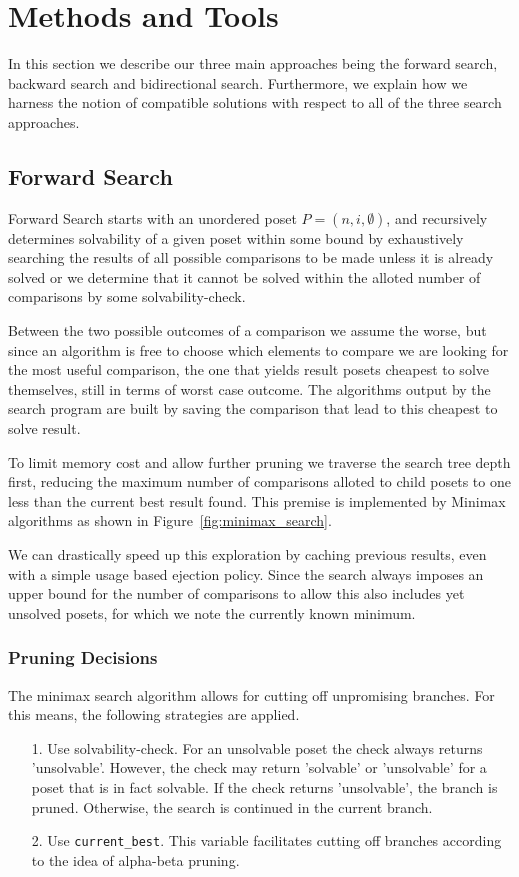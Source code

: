 \documentclass[10pt,journal,compsoc]{IEEEtran}
\begin{document}
\section{Methods and Tools}
In this section we describe our three main approaches being the forward search, backward search and bidirectional search.
Furthermore, we explain how we harness the notion of compatible solutions with respect to all of the three search approaches.

\subsection{Forward Search}\label{chapter:forward_search}
Forward Search starts with an unordered poset $P=(n,i,\emptyset)$, and recursively determines solvability of a given poset within some bound by exhaustively searching the results of all possible comparisons to be made unless it is already solved or we determine that it cannot be solved within the alloted number of comparisons by some solvability-check.

Between the two possible outcomes of a comparison we assume the worse, but since an algorithm is free to choose which elements to compare we are looking for the most useful comparison, the one that yields result posets cheapest to solve themselves, still in terms of worst case outcome.
The algorithms output by the search program are built by saving the comparison that lead to this cheapest to solve result.

To limit memory cost and allow further pruning we traverse the search tree depth first, reducing the maximum number of comparisons alloted to child posets to one less than the current best result found.
This premise is implemented by Minimax algorithms as shown in Figure~\ref{fig:minimax_search}.

We can drastically speed up this exploration by caching previous results, even with a simple usage based ejection policy. Since the search always imposes an upper bound for the number of comparisons to allow this also includes yet unsolved posets, for which we note the currently known minimum.

\subsubsection{Pruning Decisions}
The minimax search algorithm allows for cutting off unpromising branches.
For this means, the following strategies are applied.

\begin{enumerate}
  \item[1.]
    Use solvability-check. For an unsolvable poset the check always returns 'unsolvable'.
    However, the check may return 'solvable' or 'unsolvable' for a poset that is in fact solvable.
    If the check returns 'unsolvable', the branch is pruned.
    Otherwise, the search is continued in the current branch.
  \item[2.]
    Use \texttt{current\_best}. This variable facilitates cutting off branches according to the idea of alpha-beta pruning.
\end{enumerate}
\end{document}

